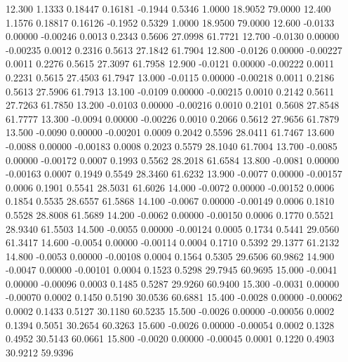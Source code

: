   12.300   1.1333   0.18447   0.16181  -0.1944   0.5346   1.0000  18.9052  79.0000
  12.400   1.1576   0.18817   0.16126  -0.1952   0.5329   1.0000  18.9500  79.0000
  12.600  -0.0133   0.00000  -0.00246   0.0013   0.2343   0.5606  27.0998  61.7721
  12.700  -0.0130   0.00000  -0.00235   0.0012   0.2316   0.5613  27.1842  61.7904
  12.800  -0.0126   0.00000  -0.00227   0.0011   0.2276   0.5615  27.3097  61.7958
  12.900  -0.0121   0.00000  -0.00222   0.0011   0.2231   0.5615  27.4503  61.7947
  13.000  -0.0115   0.00000  -0.00218   0.0011   0.2186   0.5613  27.5906  61.7913
  13.100  -0.0109   0.00000  -0.00215   0.0010   0.2142   0.5611  27.7263  61.7850
  13.200  -0.0103   0.00000  -0.00216   0.0010   0.2101   0.5608  27.8548  61.7777
  13.300  -0.0094   0.00000  -0.00226   0.0010   0.2066   0.5612  27.9656  61.7879
  13.500  -0.0090   0.00000  -0.00201   0.0009   0.2042   0.5596  28.0411  61.7467
  13.600  -0.0088   0.00000  -0.00183   0.0008   0.2023   0.5579  28.1040  61.7004
  13.700  -0.0085   0.00000  -0.00172   0.0007   0.1993   0.5562  28.2018  61.6584
  13.800  -0.0081   0.00000  -0.00163   0.0007   0.1949   0.5549  28.3460  61.6232
  13.900  -0.0077   0.00000  -0.00157   0.0006   0.1901   0.5541  28.5031  61.6026
  14.000  -0.0072   0.00000  -0.00152   0.0006   0.1854   0.5535  28.6557  61.5868
  14.100  -0.0067   0.00000  -0.00149   0.0006   0.1810   0.5528  28.8008  61.5689
  14.200  -0.0062   0.00000  -0.00150   0.0006   0.1770   0.5521  28.9340  61.5503
  14.500  -0.0055   0.00000  -0.00124   0.0005   0.1734   0.5441  29.0560  61.3417
  14.600  -0.0054   0.00000  -0.00114   0.0004   0.1710   0.5392  29.1377  61.2132
  14.800  -0.0053   0.00000  -0.00108   0.0004   0.1564   0.5305  29.6506  60.9862
  14.900  -0.0047   0.00000  -0.00101   0.0004   0.1523   0.5298  29.7945  60.9695
  15.000  -0.0041   0.00000  -0.00096   0.0003   0.1485   0.5287  29.9260  60.9400
  15.300  -0.0031   0.00000  -0.00070   0.0002   0.1450   0.5190  30.0536  60.6881
  15.400  -0.0028   0.00000  -0.00062   0.0002   0.1433   0.5127  30.1180  60.5235
  15.500  -0.0026   0.00000  -0.00056   0.0002   0.1394   0.5051  30.2654  60.3263
  15.600  -0.0026   0.00000  -0.00054   0.0002   0.1328   0.4952  30.5143  60.0661
  15.800  -0.0020   0.00000  -0.00045   0.0001   0.1220   0.4903  30.9212  59.9396

